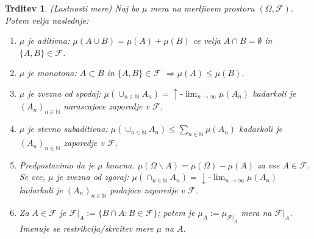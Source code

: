 \documentclass[a4paper,12pt]{article}
\newtheorem{trditev}{Trditev}
\newcommand{\N}{\mathbb{N}}
\newcommand{\F}{\mathcal{F}}
\begin{document}
            \begin{trditev}(Lastnosti mere)
                Naj bo $\mu$ mera na merljivem prostoru $\left( \Omega, \F \right)$. Potem velja naslednje:
                \begin{enumerate}
                    \item $\mu$ je aditivna: $\mu(A \cup B) = \mu(A) + \mu(B)$ ce velja $A \cap B = \emptyset$ in $\{A, B\} \in \F$.
                    \item $\mu$ je monotona: $A \subset B$ in $ \{A, B\} \in \F$ $ \Rightarrow \mu(A) \leq \mu(B)$.
                    \item $\mu$ je zvezna od spodaj: $\mu(\cup_{n \in \N}A_n) = \uparrow\text{-}\lim_{n \rightarrow \infty}\mu(A_n)$ kadarkoli je $(A_n)_{n \in \N}$ narascajoce zaporedje v $\F$.
                    \item $\mu$ je stevno subaditivna: $\mu(\cup_{n \in \N}A_n) \leq \sum_{n \in \N}\mu(A_n)$ kadarkoli je $(A_n)_{n \in \N}$ zaporedje v $\F$.
                    \item Predpostavimo da je $\mu$ koncna. $\mu(\Omega\backslash A) = \mu(\Omega) - \mu(A)$ za vse $A \in \F$. Se vec, $\mu$ je zvezna od zgoraj: $\mu(\cap_{n \in \N}A_n) = \downarrow\text{-}\lim_{n \rightarrow \infty}\mu(A_n)$ kadarkoli je $(A_n)_{n \in \N}$ padajoce zaporedje v $\F$.
                    \item Za $A \in \F$ je $\F|_A:=\{B \cap A: B \in \F\}$; potem je $\mu_A:= \mu_{\F|_A}$ mera na $\F|_A$. Imenuje se restrikcija/skrcitev mere $\mu$ na $A$.  
                \end{enumerate}             
            \end{trditev}
\end{document}
